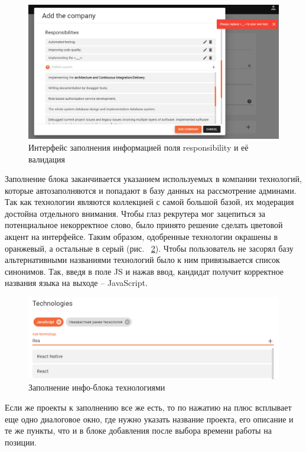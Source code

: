 \documentclass[14pt, a4paper]{diplom}
\begin{document}
\begin{figure}[!ht]
\centering
\includegraphics[width=1\textwidth]{resources/responsibility.png}
\caption{Интерфейс заполнения информацией поля responsibility и её валидация}
\label{11}
\end{figure}

Заполнение блока заканчивается указанием используемых в компании технологий, которые автозаполняются и попадают в базу данных на рассмотрение админами.
Так как технологии являются коллекцией с самой большой базой, их модерация достойна отдельного внимания. Чтобы глаз рекрутера мог зацепиться за потенциальное некорректное слово, было принято решение
сделать цветовой акцент на интерфейсе. Таким образом, одобренные технологии окрашены в оранжевый, а остальные в серый (рис. ~\ref{12}). Чтобы пользователь не засорял базу альтернативными названиями технологий было к ним привязывается список синонимов. Так, введя в поле JS и нажав ввод,
кандидат получит корректное названия языка на выходе -- JavaScript.

\begin{figure}[!ht]
	\centering
	\includegraphics[width=1\textwidth]{resources/technologies.png}
	\caption{Заполнение инфо-блока технологиями}
	\label{12}
\end{figure}

Если же проекты к заполнению все же есть, то по нажатию на плюс всплывает еще одно диалоговое окно, где нужно
указать название проекта, его описание и те же пункты, что и в блоке добавления после выбора времени работы на позиции.
\end{document}
